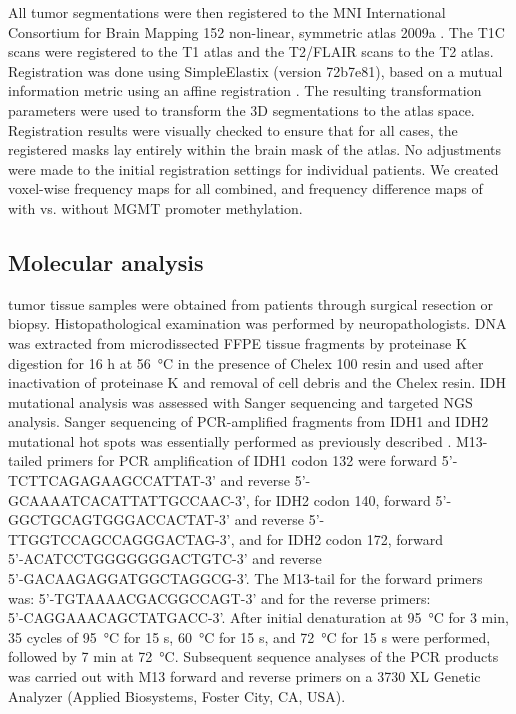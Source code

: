 All \gls{tumor} segmentations were then registered to the \gls{MNI} International Consortium for Brain Mapping 152 non-linear, symmetric atlas 2009a \autocite{fonov2011unbiased, fonov2009unbiased}.
The \gls{T1C} scans were registered to the \acrlong{T1} atlas and the \gls{T2}/\gls{FLAIR} scans to the \gls{T2} atlas.
Registration was done using SimpleElastix (version 72b7e81), based on a mutual information metric using an affine registration \autocite{marstal2016simpleelastix}.
The resulting transformation parameters were used to transform the 3D segmentations to the atlas space.
Registration results were visually checked to ensure that for all cases, the registered masks lay entirely within the brain mask of the atlas.
No adjustments were made to the initial registration settings for individual patients.
We created voxel-wise frequency maps for all  combined, and frequency difference maps of  with vs. without \gls{MGMT} promoter methylation.

\subsection{Molecular analysis}

\Gls{tumor} tissue samples were obtained from patients through surgical resection or biopsy.
Histopathological examination was performed by neuropathologists.
DNA was extracted from microdissected \gls{FFPE} tissue fragments by proteinase K digestion for 16 h at \SI{56}{\celsius} in the presence of  Chelex 100 resin and used after inactivation of proteinase K and removal of cell debris and the Chelex resin.
\gls{IDH} mutational analysis was assessed with Sanger sequencing and targeted \gls{NGS} analysis.
Sanger sequencing of PCR-amplified fragments from \gls{IDH}1 and \gls{IDH}2 mutational hot spots was essentially performed as previously described \autocite{vandenbent2013interlaboratory}.
M13-tailed primers for PCR amplification of IDH1 codon 132 were forward {5'-TCTTCAGAGAAGCCATTAT-3'} and reverse {5'-GCAAAATCACATTATTGCCAAC-3'}, for IDH2 codon 140, forward {5'-GGCTGCAGTGGGACCACTAT-3'} and reverse {5'-TTGGTCCAGCCAGGGACTAG-3'}, and for IDH2 codon 172, forward \\ {5'-ACATCCTGGGGGGGACTGTC-3'} and reverse \\{5'-GACAAGAGGATGGCTAGGCG-3'}.
The M13-tail for the forward primers was: {5'-TGTAAAACGACGGCCAGT-3'} and for the reverse primers: \\{5'-CAGGAAACAGCTATGACC-3'}.
After initial denaturation at \SI{95}{\celsius} for 3 min, 35 cycles of \SI{95}{\celsius} for 15 s, \SI{60}{\celsius} for 15 s, and \SI{72}{\celsius} for 15 s were performed, followed by 7 min at \SI{72}{\celsius}.
Subsequent sequence analyses of the PCR products was carried out with M13 forward and reverse primers on a 3730 XL Genetic Analyzer (Applied Biosystems, Foster City, CA, USA).


